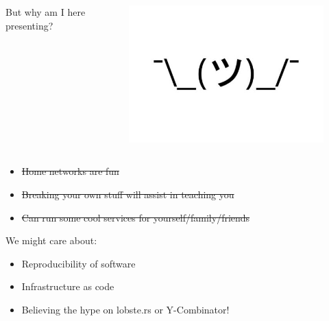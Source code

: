 \documentclass{beamer}
\begin{document}
\begin{frame}
    \begin{columns}
        \begin{column}{0.5\textwidth}
            But why am I here presenting?
        \end{column}
        \begin{column}{0.5\textwidth}
            \begin{figure}
                \centering
                \includegraphics[width=\textwidth,keepaspectratio]{../resources/shrug.jpg}
            \end{figure}
        \end{column}
    \end{columns}
\end{frame}

\begin{frame}
    \begin{itemize}
        \item \st{Home networks are fun}
        \item \st{Breaking your own stuff will assist in teaching you}
        \item \st{Can run some cool services for yourself/family/friends}
    \end{itemize}
\end{frame}

\begin{frame}
    We might care about:
    \begin{itemize}
        \item Reproducibility of software
        \item Infrastructure as code
        \item Believing the hype on lobste.rs or Y-Combinator!
    \end{itemize}
\end{frame}
\end{document}
